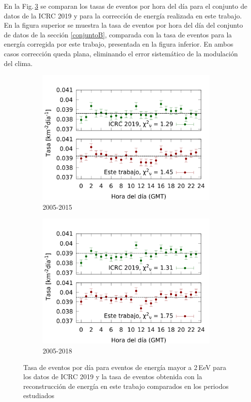 En la Fig.\,\ref{final} se comparan los tasas de eventos por hora del día para el conjunto de datos de la ICRC 2019 y para la corrección de energía realizada en este trabajo. En la figura superior se muestra la tasa de eventos por hora del día del conjunto de datos de la sección \ref{conjuntoB}, comparada con la tasa de eventos para la energía corregida por este trabajo, presentada en la figura inferior. En ambos casos corrección queda plana, eliminando el error sistemático de la modulación del clima.
			\begin{figure}[H]
    				\begin{subfigure}[b]{0.5\textwidth}
					\includegraphics[width=\textwidth]{Graphs/2EeV_ICRC_2019_S38_S1000_expected.png}
					\caption{2005-2015} \label{fig:2EeV_expected}
    				\end{subfigure}%
    				\hspace{\fill}
    				\begin{subfigure}[b]{0.5\textwidth}
					\includegraphics[width=\textwidth]{Graphs/2EeV_ICRC_2019_S38_S1000_expected_05_18.png}
					\caption{2005-2018}\label{fig:2EeV_expected_05_18}
					\end{subfigure}%
					\caption{Tasa de eventos por día para eventos de energía mayor a 2\,EeV para los datos de ICRC 2019 y la tasa de eventos obtenida con la reconstrucción de energía en este trabajo comparados en los periodos estudiados}\label{final}
			\end{figure}
